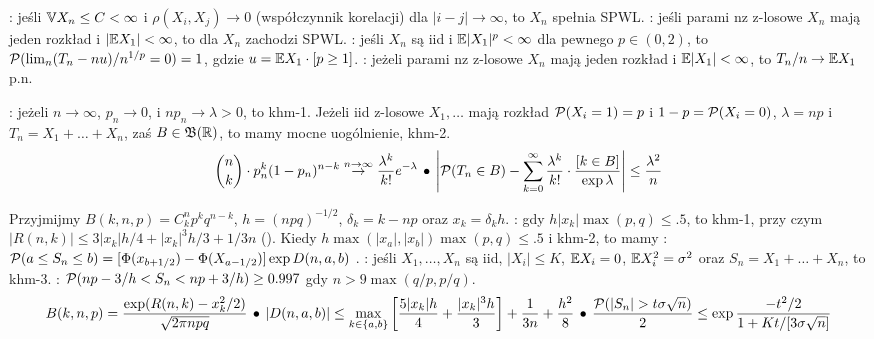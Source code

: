 : jeśli $\mathbb{V} X_n \le C < \infty$ i $\rho(X_i, X_j) \to 0$ (współczynnik korelacji) dla $|i - j| \to \infty$, to $X_n$ spełnia SPWL.
: jeśli parami nz z-losowe $X_n$ mają jeden rozkład i $|\mathbb{E} X_1| < \infty$, to dla $X_n$ zachodzi SPWL.
: jeśli $X_n$ są iid i $\mathbb{E} |X_1|^p <\infty$ dla pewnego $p \in (0,2)$, to $\operatorname{\mathcal{P}} (\lim_n (T_n-nu) / n^{1/p} = 0) = 1$, gdzie $u = \mathbb{E} X_1 \cdot [p \ge 1]$.
: jeżeli parami nz z-losowe $X_n$ mają jeden rozkład i $\mathbb{E} |X_1| < \infty$, to $T_n/n \to \mathbb{E} X_1$ p.n.

:  jeżeli $n \to \infty$, $p_n \to 0$, i $n p_n \to \lambda > 0$, to khm-1.
Jeżeli iid z-losowe $X_1, \ldots$ mają rozkład $\operatorname{\mathcal{P}} (X_i = 1) = p$ i $1 - p = \operatorname{\mathcal{P}} (X_i = 0)$, $\lambda = np$ i $T_n = X_1 + \dots + X_n$, zaś $B \in \mathfrak B(\mathbb{R})$, to mamy mocne uogólnienie, khm-2.
\[
	{n \choose k} \cdot p_n^k (1-p_n)^{n-k} \stackrel{n \to \infty}{\to} \frac{\lambda^k}{k!} e^{-\lambda} \, \bullet \,
	\left|\operatorname{\mathcal{P}} (T_n \in B) - \sum_{k = 0}^\infty \frac{\lambda^k}{k!} \cdot \frac{[k \in B]}{\exp \lambda} \right| \le \frac{\lambda^2}{n} 
\]

Przyjmijmy $B(k,n,p) = C_k^n p^k q^{n-k}$, $h = (npq)^{-1/2}$, $\delta_k = k - np$ oraz $x_k= \delta_k h$.
:  gdy $h |x_k| \max(p,q) \le .5$, to khm-1, przy czym $|R(n,k)| \le {3|x_k|h}/{4} + |x_k|^3h/3 + 1/3n$ ().
Kiedy $h \max(|x_a|, |x_b|) \max(p,q) \le .5$ i khm-2, to mamy : $\operatorname{\mathcal{P}} (a \le S_n \le b) = [\Phi(x_{b + 1/2}) - \Phi(X_{a - 1/2})] \exp D(n,a,b)$ .
: jeśli $X_1, \dots, X_n$ są iid, $|X_i| \le K$, $\mathbb{E} X_i = 0$, $\mathbb{E} X_i^2 = \sigma^2$ oraz $S_n = X_1 + \dots + X_n$, to khm-3.
: $\operatorname{\mathcal{P}} (np - 3/h < S_n < np + 3/h) \ge 0.997$ gdy $n > 9 \max (q/p, p/q)$.
\[
	B(k,n,p) = \frac{\exp(R(n,k) - x^2_k/2)}{\sqrt{2\pi n p q}} \, \bullet \,
	|D(n,a,b)| \le \max_{k\in\{a,b\}} \left[\frac{5 |x_k| h}{4} + \frac{|x_k|^3 h}{3} \right] + \frac{1}{3n} + \frac{h^2}{8} \, \bullet \,
	\frac{\operatorname{\mathcal{P}} (|S_n| > t \sigma \sqrt{n})}{2} \le \exp \frac{-t^2/2}{1 + Kt / [3\sigma \sqrt{n}]}
\]